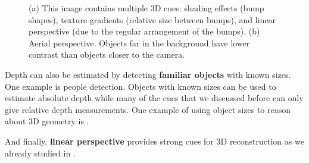 \begin{figure}
    \centerline{
    }
    \caption{(a) This image contains multiple 3D cues: shading effects (bump shapes), texture gradients (relative size between bumps), and linear perspective (due to the regular arrangement of the bumps). (b) Aerial perspective. Objects far in the background have lower contrast than objects closer to the camera.}
    \label{fig:aerial_perspective}
\end{figure}

Depth can also be estimated by detecting {\bf familiar objects} with known sizes. One example is people detection. Objects with known sizes can be used to estimate absolute depth while many of the cues that we discussed before can only give relative depth measurements. One example of using object sizes to reason about 3D geometry is \cite{Hoiem2008}.

And finally, {\bf linear perspective} provides strong cues for 3D reconstruction as we already studied in \chap{\ref{chapter:3D_single_view}}.





